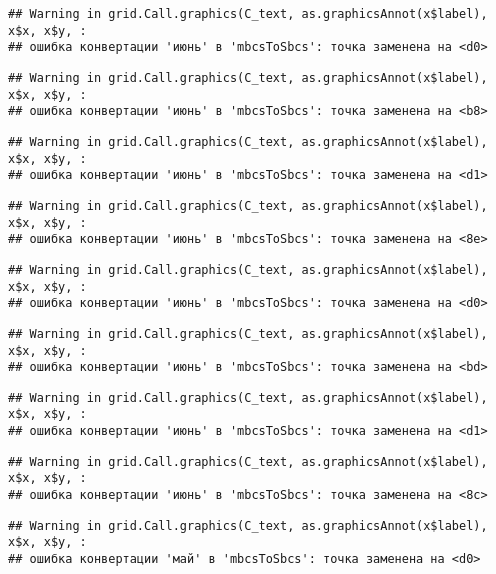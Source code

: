 \documentclass[
]{article}
\begin{document}
\begin{verbatim}
## Warning in grid.Call.graphics(C_text, as.graphicsAnnot(x$label), x$x, x$y, :
## ошибка конвертации 'июнь' в 'mbcsToSbcs': точка заменена на <d0>
\end{verbatim}

\begin{verbatim}
## Warning in grid.Call.graphics(C_text, as.graphicsAnnot(x$label), x$x, x$y, :
## ошибка конвертации 'июнь' в 'mbcsToSbcs': точка заменена на <b8>
\end{verbatim}

\begin{verbatim}
## Warning in grid.Call.graphics(C_text, as.graphicsAnnot(x$label), x$x, x$y, :
## ошибка конвертации 'июнь' в 'mbcsToSbcs': точка заменена на <d1>
\end{verbatim}

\begin{verbatim}
## Warning in grid.Call.graphics(C_text, as.graphicsAnnot(x$label), x$x, x$y, :
## ошибка конвертации 'июнь' в 'mbcsToSbcs': точка заменена на <8e>
\end{verbatim}

\begin{verbatim}
## Warning in grid.Call.graphics(C_text, as.graphicsAnnot(x$label), x$x, x$y, :
## ошибка конвертации 'июнь' в 'mbcsToSbcs': точка заменена на <d0>
\end{verbatim}

\begin{verbatim}
## Warning in grid.Call.graphics(C_text, as.graphicsAnnot(x$label), x$x, x$y, :
## ошибка конвертации 'июнь' в 'mbcsToSbcs': точка заменена на <bd>
\end{verbatim}

\begin{verbatim}
## Warning in grid.Call.graphics(C_text, as.graphicsAnnot(x$label), x$x, x$y, :
## ошибка конвертации 'июнь' в 'mbcsToSbcs': точка заменена на <d1>
\end{verbatim}

\begin{verbatim}
## Warning in grid.Call.graphics(C_text, as.graphicsAnnot(x$label), x$x, x$y, :
## ошибка конвертации 'июнь' в 'mbcsToSbcs': точка заменена на <8c>
\end{verbatim}

\begin{verbatim}
## Warning in grid.Call.graphics(C_text, as.graphicsAnnot(x$label), x$x, x$y, :
## ошибка конвертации 'май' в 'mbcsToSbcs': точка заменена на <d0>
\end{verbatim}
\end{document}
